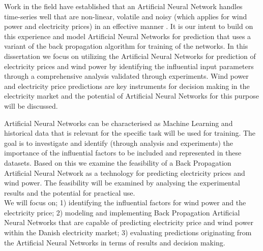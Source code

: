 Work in the field have established that an Artificial Neural Network handles time-series well that are non-linear, volatile and noisy (which applies for wind power and electricity prices) in an effective manner \cite{stockForecasting,pjmForecast,yamin2004adaptive,windForecastPortugal}. It is our intent to build on this experience and model Artificial Neural Networks for prediction that uses a variant of the back propagation algorithm for training of the networks. In this dissertation we focus on utilizing the Artificial Neural Networks for prediction of electricity prices and wind power by identifying the influential input parameters through a comprehensive analysis validated through experiments. Wind power and electricity price predictions are key instruments for decision making in the electricity market\cite{dayAheadImpactOfWindPowerForecasts,21} and the potential of Artificial Neural Networks for this purpose will be discussed.

Artificial Neural Networks can be characterised as Machine Learning\cite{18} and historical data that is relevant for the specific task will be used for training. The goal is to investigate and identify (through analysis and experiments) the importance of the influential factors to be included and represented in these datasets. Based on this we examine the feasibility of a Back Propagation Artificial Neural Network as a technology for predicting electricity prices and wind power. The feasibility will be examined by analysing the experimental results and the potential for practical use.
\\[0.5cm]
We will focus on; 1) identifying the influential factors for wind power and the electricity price; 2) modeling and implementing Back Propagation Artificial Neural Networks that are capable of predicting electricity price and wind power within the Danish electricity market; 3) evaluating predictions originating from the Artificial Neural Networks in terms of results and decision making.